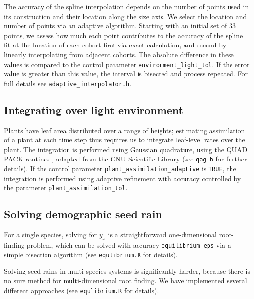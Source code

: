 \documentclass[10pt,twoside]{article}
\begin{document}
The accuracy of the spline interpolation depends on the number of points
used in its construction and their location along the size axis. We
select the location and number of points via an adaptive algorithm.
Starting with an initial set of 33 points, we assess how much each point
contributes to the accuracy of the spline fit at the location of each
cohort first via exact calculation, and second by linearly interpolating
from adjacent cohorts. The absolute difference in these values is
compared to the control parameter \texttt{environment\_light\_tol}. If
the error value is greater than this value, the interval is bisected and
process repeated. For full details see
\texttt{adaptive\_interpolator.h}.

\subsection{Integrating over light
environment}\label{integrating-over-light-environment}

Plants have leaf area distributed over a range of heights; estimating
assimilation of a plant at each time step thus requires us to integrate
leaf-level rates over the plant. The integration is performed using
Gaussian quadrature, using the QUAD PACK routines \citep{Piessens-1983},
adapted from the \href{http://www.gnu.org/software/gsl/}{GNU Scientific
Library}\citep{Galassi-2009} (see \texttt{qag.h} for further details).
If the control parameter \texttt{plant\_assimilation\_adaptive} is \texttt{TRUE},
the integration is performed using adaptive refinement with accuracy
controlled by the parameter \texttt{plant\_assimilation\_tol}.

\subsection{Solving demographic seed
rain}\label{solving-demographic-seed-rain}

For a single species, solving for \(y_x\) is a straightforward
one-dimensional root-finding problem, which can be solved with accuracy
\texttt{equilibrium\_eps} via a simple bisection algorithm (see 
\texttt{equlibrium.R} for details). 

Solving seed rains in multi-species systems is significantly harder,
because there is no sure method for multi-dimensional root finding. We
have implemented several different approaches (see 
\texttt{equlibrium.R} for details).


\clearpage
\end{document}
